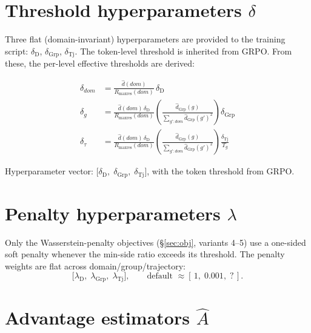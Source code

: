 \documentclass{article}
\begin{document}
\section{Threshold hyperparameters \texorpdfstring{$\delta$}{delta}}
\label{sec:delta}

Three flat (domain-invariant) hyperparameters are provided to the training
script: $\delta_{\text{D}}$, $\delta_{\operatorname{Grp}}$,
$\delta_{\operatorname{Tj}}$. The token-level threshold is inherited from
GRPO. From these, the per-level effective thresholds are derived:

\begin{align*}
\delta_{dom} &= \frac{\hat d(dom)}{R_{\max\text{res}}(dom)}\,\delta_{\text{D}} \\[3pt]
\delta_g
  &= \frac{\hat d(dom)\,\delta_{\text{D}}}{R_{\max\text{res}}(dom)}
     \left( \frac{\hat d_{\operatorname{Grp}}(g)}{\sum_{g':dom} \hat d_{\operatorname{Grp}}(g')^{2}} \right)
     \delta_{\operatorname{Grp}} \\[3pt]
\delta_\tau
  &= \frac{\hat d(dom)\,\delta_{\text{D}}}{R_{\max\text{res}}(dom)}
     \left( \frac{\hat d_{\operatorname{Grp}}(g)}{\sum_{g':dom} \hat d_{\operatorname{Grp}}(g')^{2}} \right)
     \frac{\delta_{\operatorname{Tj}}}{T_g}
\end{align*}

Hyperparameter vector:
$\bigl[\delta_{\text{D}},\; \delta_{\operatorname{Grp}},\; \delta_{\operatorname{Tj}}\bigr]$,
with the token threshold from GRPO.

\section{Penalty hyperparameters \texorpdfstring{$\lambda$}{lambda}}

Only the Wasserstein-penalty objectives (\S\ref{sec:obj}, variants 4--5) use
a one-sided soft penalty whenever the min-side ratio exceeds its threshold.
The penalty weights are flat across domain/group/trajectory:
\[
\bigl[\lambda_{\text{D}},\; \lambda_{\operatorname{Grp}},\; \lambda_{\operatorname{Tj}}\bigr],
\qquad \text{default }\approx [\,1,\; 0.001,\; ?\,].
\]

\section{Advantage estimators \texorpdfstring{$\hat A$}{A-hat}}
\label{sec:adv}
\end{document}
